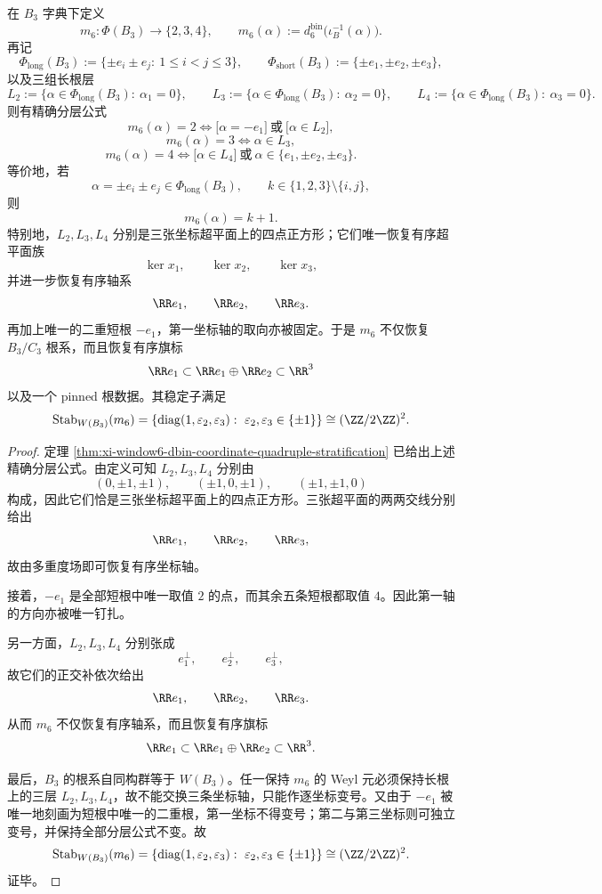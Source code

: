 \begin{theorem}\label{thm:conclusion-window6-multiplicity-pinning}
在 \(B_3\) 字典下定义
\[
m_6:\Phi(B_3)\longrightarrow \{2,3,4\},
\qquad
m_6(\alpha):=d_6^{\mathrm{bin}}\bigl(\iota_B^{-1}(\alpha)\bigr).
\]
再记
\[
\Phi_{\mathrm{long}}(B_3):=\{\pm e_i\pm e_j:\ 1\le i<j\le 3\},
\qquad
\Phi_{\mathrm{short}}(B_3):=\{\pm e_1,\pm e_2,\pm e_3\},
\]
以及三组长根层
\[
L_2:=\{\alpha\in \Phi_{\mathrm{long}}(B_3):\ \alpha_1=0\},
\qquad
L_3:=\{\alpha\in \Phi_{\mathrm{long}}(B_3):\ \alpha_2=0\},
\qquad
L_4:=\{\alpha\in \Phi_{\mathrm{long}}(B_3):\ \alpha_3=0\}.
\]
则有精确分层公式
\[
m_6(\alpha)=2
\iff
\bigl[\alpha=-e_1\bigr]\ \text{或}\ \bigl[\alpha\in L_2\bigr],
\]
\[
m_6(\alpha)=3
\iff
\alpha\in L_3,
\]
\[
m_6(\alpha)=4
\iff
\bigl[\alpha\in L_4\bigr]\ \text{或}\ \alpha\in\{e_1,\pm e_2,\pm e_3\}.
\]
等价地，若
\[
\alpha=\pm e_i\pm e_j\in \Phi_{\mathrm{long}}(B_3),
\qquad
k\in \{1,2,3\}\setminus\{i,j\},
\]
则
\[
m_6(\alpha)=k+1.
\]
特别地，\(L_2,L_3,L_4\) 分别是三张坐标超平面上的四点正方形；它们唯一恢复有序超平面族
\[
\ker x_1,\qquad \ker x_2,\qquad \ker x_3,
\]
并进一步恢复有序轴系
\[
\RR e_1,\qquad \RR e_2,\qquad \RR e_3.
\]
再加上唯一的二重短根 \(-e_1\)，第一坐标轴的取向亦被固定。于是 \(m_6\) 不仅恢复 \(B_3/C_3\) 根系，而且恢复有序旗标
\[
\RR e_1\subset \RR e_1\oplus \RR e_2\subset \RR^3
\]
以及一个 pinned 根数据。其稳定子满足
\[
\operatorname{Stab}_{W(B_3)}(m_6)
=
\left\{
\operatorname{diag}(1,\varepsilon_2,\varepsilon_3):\ \varepsilon_2,\varepsilon_3\in\{\pm 1\}
\right\}
\cong (\ZZ/2\ZZ)^2.
\]
\end{theorem}
\begin{proof}
定理 \ref{thm:xi-window6-dbin-coordinate-quadruple-stratification} 已给出上述精确分层公式。由定义可知 \(L_2,L_3,L_4\) 分别由
\[
(0,\pm 1,\pm 1),\qquad
(\pm 1,0,\pm 1),\qquad
(\pm 1,\pm 1,0)
\]
构成，因此它们恰是三张坐标超平面上的四点正方形。三张超平面的两两交线分别给出
\[
\RR e_1,\qquad \RR e_2,\qquad \RR e_3,
\]
故由多重度场即可恢复有序坐标轴。

接着，\(-e_1\) 是全部短根中唯一取值 \(2\) 的点，而其余五条短根都取值 \(4\)。因此第一轴的方向亦被唯一钉扎。

另一方面，\(L_2,L_3,L_4\) 分别张成
\[
e_1^\perp,\qquad e_2^\perp,\qquad e_3^\perp,
\]
故它们的正交补依次给出
\[
\RR e_1,\qquad \RR e_2,\qquad \RR e_3.
\]
从而 \(m_6\) 不仅恢复有序轴系，而且恢复有序旗标
\[
\RR e_1\subset \RR e_1\oplus \RR e_2\subset \RR^3.
\]

最后，\(B_3\) 的根系自同构群等于 \(W(B_3)\)。任一保持 \(m_6\) 的 Weyl 元必须保持长根上的三层 \(L_2,L_3,L_4\)，故不能交换三条坐标轴，只能作逐坐标变号。又由于 \(-e_1\) 被唯一地刻画为短根中唯一的二重根，第一坐标不得变号；第二与第三坐标则可独立变号，并保持全部分层公式不变。故
\[
\operatorname{Stab}_{W(B_3)}(m_6)
=
\left\{
\operatorname{diag}(1,\varepsilon_2,\varepsilon_3):\ \varepsilon_2,\varepsilon_3\in\{\pm1\}
\right\}
\cong (\ZZ/2\ZZ)^2.
\]
证毕。
\end{proof}

